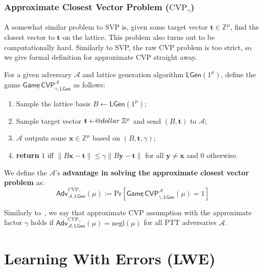 \documentclass{template}
\makeatletter
\newcommand\leftarrowS{\leftarrow\joinrel\smalldollar}
\newcommand{\smalldollar}{\mathrel{\mathpalette\small@dollar\relax}}
\newcommand{\small@dollar}[2]{%
  \vcenter{\hbox{%
    $#1\textnormal{\fontsize{0.7\dimexpr\f@size pt}{0}\selectfont\$}$%
  }}%
}
\makeatother
\begin{document}
\subsubsection{Approximate Closest Vector Problem ($\text{CVP}_{\gamma}$)}\label{section:approximate-cvp}

A somewhat similar problem to SVP is, given some target vector $\mathbf{t} \in
\mathbb{Z}^{\mu}$, find the closest vector to $\mathbf{t}$ on the lattice. This
problem also turns out to be computationally hard. Similarly to SVP, the raw CVP
problem is too strict, so we give formal definition for approximate CVP straight away.

\begin{definition}\label{def:cvp}
    For a given adversary $\mathcal{A}$ and lattice generation algorithm
    $\mathsf{LGen}(1^{\mu})$, define the game
    $\underline{\mathsf{Game}\,\mathsf{CVP}}^{\mathcal{A}}_{\gamma,\mathsf{LGen}}$ as follows:
    \begin{enumerate}
        \item Sample the lattice basis $B \gets \mathsf{LGen}(1^{\mu})$;
        \item Sample target vector $\mathbf{t} \leftarrowS \mathbb{Z}^{\mu}$ and
        send $(B,\mathbf{t})$ to $\mathcal{A}$;
        \item $\mathcal{A}$ outputs some $\mathbf{x} \in \mathbb{Z}^{\mu}$ based
        on $(B,\mathbf{t},\gamma)$;
        \item \textbf{return} $1$ iff $\|B\mathbf{x}-\mathbf{t}\| \leq \gamma\|B\mathbf{y}-\mathbf{t}\|$
        for all $\mathbf{y} \neq \mathbf{x}$ and $0$ otherwise.
    \end{enumerate}
    We define the $\mathcal{A}$'s \textbf{advantage in solving the approximate closest
    vector problem} as:
    \begin{equation*}
        \mathsf{Adv}^{\text{CVP}_{\gamma}}_{\mathcal{A},\mathsf{LGen}}(\mu) := \text{Pr}\left[\underline{\mathsf{Game}\,\mathsf{CVP}}^{\mathcal{A}}_{\gamma,\mathsf{LGen}}(\mu) = 1\right]
    \end{equation*} 
\end{definition}

Similarly to~, we say that approximate CVP
assumption with the approximate factor $\gamma$ holds if
$\mathsf{Adv}^{\text{CVP}_{\gamma}}_{\mathcal{A},\mathsf{LGen}}(\mu)=\text{negl}(\mu)$
for all PTT adversaries $\mathcal{A}$.

\section{Learning With Errors (LWE)}\label{section:lwe}
\end{document}
